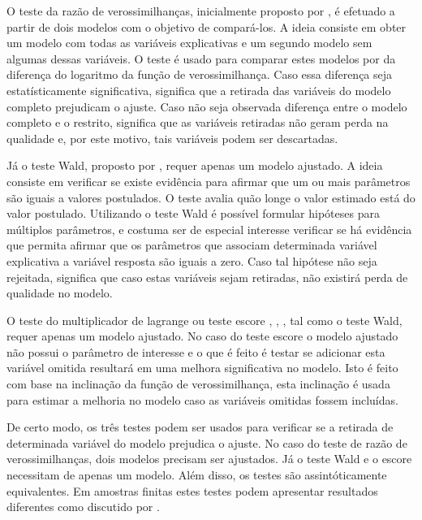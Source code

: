 O teste da razão de verossimilhanças, inicialmente proposto por \citet{trv}, é efetuado a partir de dois modelos com o objetivo de compará-los. A ideia consiste em obter um modelo com todas as variáveis explicativas e um segundo modelo sem algumas dessas variáveis. O teste é usado para comparar estes modelos por da diferença do logaritmo da função de verossimilhança. Caso essa diferença seja estatísticamente significativa, significa que a retirada das variáveis do modelo completo prejudicam o ajuste. Caso não seja observada diferença entre o modelo completo e o restrito, significa que as variáveis retiradas não geram perda na qualidade e, por este motivo, tais variáveis podem ser descartadas.

Já o teste Wald, proposto por \citet{wald}, requer apenas um modelo ajustado. A ideia consiste em verificar se existe evidência para afirmar que um ou mais parâmetros são iguais a valores postulados. O teste avalia quão longe o valor estimado está do valor postulado. Utilizando o teste Wald é possível formular hipóteses para múltiplos parâmetros, e costuma ser de especial interesse verificar se há evidência que permita afirmar que os parâmetros que associam determinada variável explicativa a variável resposta são iguais a zero. Caso tal hipótese não seja rejeitada, significa que caso estas variáveis sejam retiradas, não existirá perda de qualidade no modelo.

O teste do multiplicador de lagrange ou teste escore \citep{score1}, \citep{score2}, \citep{score3}, tal como o teste Wald, requer apenas um modelo ajustado. No caso do teste escore o modelo ajustado não possui o parâmetro de interesse e o que é feito é testar se adicionar esta variável omitida resultará em uma melhora significativa no modelo. Isto é feito com base na inclinação da função de verossimilhança, esta inclinação é usada para estimar a melhoria no modelo caso as variáveis omitidas fossem incluídas.

De certo modo, os três testes podem ser usados para verificar se a retirada de determinada variável do modelo prejudica o ajuste. No caso do teste de razão de verossimilhanças, dois modelos precisam ser ajustados. Já o teste Wald e o escore necessitam de apenas um modelo. Além disso, os testes são assintóticamente equivalentes. Em amostras finitas estes testes podem apresentar resultados diferentes como discutido por \citet{conflict}.


